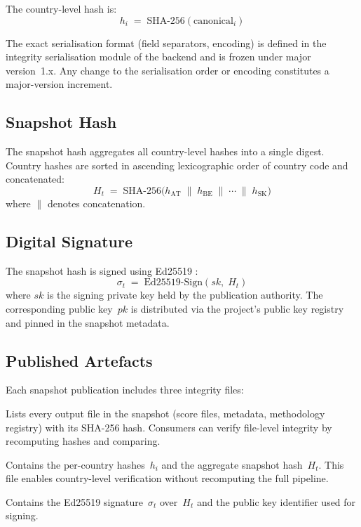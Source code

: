 The country-level hash is:
%
\[
  h_i \;=\; \mathrm{SHA\text{-}256}(\text{canonical}_i)
\]

The exact serialisation format (field separators, encoding) is defined in
the integrity serialisation module of the backend and is frozen under
major version~1.x.  Any change to the serialisation order or encoding
constitutes a major-version increment.

\subsection{Snapshot Hash}\label{sec:integrity:snapshot}

The snapshot hash aggregates all country-level hashes into a single digest.
Country hashes are sorted in ascending lexicographic order of country code
and concatenated:
%
\[
  H_t \;=\; \mathrm{SHA\text{-}256}\!\bigl(h_{\mathrm{AT}} \;\|\;
  h_{\mathrm{BE}} \;\|\; \cdots \;\|\; h_{\mathrm{SK}}\bigr)
\]
%
where \(\|\) denotes concatenation.

\subsection{Digital Signature}\label{sec:integrity:signature}

The snapshot hash is signed using Ed25519 \citep{bernstein2012eddsa}:
%
\[
  \sigma_t \;=\; \mathrm{Ed25519\text{-}Sign}(sk,\; H_t)
\]
%
where \(sk\) is the signing private key held by the publication authority.
The corresponding public key~\(pk\) is distributed via the project's public
key registry and pinned in the snapshot metadata.

\subsection{Published Artefacts}\label{sec:integrity:artefacts}

Each snapshot publication includes three integrity files:

\begin{description}[style=nextline]
  \item[\texttt{MANIFEST.json}]
    Lists every output file in the snapshot (score files, metadata,
    methodology registry) with its SHA-256 hash.  Consumers can verify
    file-level integrity by recomputing hashes and comparing.
  \item[\texttt{HASH\_SUMMARY.json}]
    Contains the per-country hashes~\(h_i\) and the aggregate snapshot
    hash~\(H_t\).  This file enables country-level verification without
    recomputing the full pipeline.
  \item[\texttt{SIGNATURE.json}]
    Contains the Ed25519 signature~\(\sigma_t\) over~\(H_t\) and the
    public key identifier used for signing.
\end{description}


